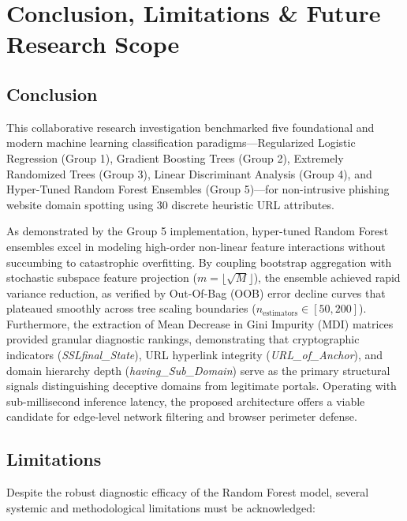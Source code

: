 \section{Conclusion, Limitations \& Future Research Scope}
\label{sec:conclusion}

\subsection{Conclusion}
This collaborative research investigation benchmarked five foundational and modern machine learning classification paradigms---Regularized Logistic Regression (Group 1), Gradient Boosting Trees (Group 2), Extremely Randomized Trees (Group 3), Linear Discriminant Analysis (Group 4), and Hyper-Tuned Random Forest Ensembles (Group 5)---for non-intrusive phishing website domain spotting using 30 discrete heuristic URL attributes. 

As demonstrated by the Group 5 implementation, hyper-tuned Random Forest ensembles excel in modeling high-order non-linear feature interactions without succumbing to catastrophic overfitting. By coupling bootstrap aggregation with stochastic subspace feature projection ($m = \lfloor\sqrt{M}\rfloor$), the ensemble achieved rapid variance reduction, as verified by Out-Of-Bag (OOB) error decline curves that plateaued smoothly across tree scaling boundaries ($n_{\text{estimators}} \in [50, 200]$). Furthermore, the extraction of Mean Decrease in Gini Impurity (MDI) matrices provided granular diagnostic rankings, demonstrating that cryptographic indicators (\textit{SSLfinal\_State}), URL hyperlink integrity (\textit{URL\_of\_Anchor}), and domain hierarchy depth (\textit{having\_Sub\_Domain}) serve as the primary structural signals distinguishing deceptive domains from legitimate portals. Operating with sub-millisecond inference latency, the proposed architecture offers a viable candidate for edge-level network filtering and browser perimeter defense.

\subsection{Limitations}
Despite the robust diagnostic efficacy of the Random Forest model, several systemic and methodological limitations must be acknowledged:

